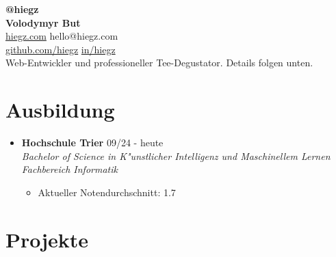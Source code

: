 \documentclass[]{article}
\begin{document}
\begin{center}
    \textbf{\Large @hiegz} \\[3pt]
    \textbf{\huge Volodymyr But} \\[7pt]

     \href{https://www.hiegz.com}{hiegz.com}
    \hspace{5pt}
     hello@hiegz.com \\[2pt]

     \href{https://github.com/hiegz}{github.com/hiegz}
    \hspace{5pt}
     \href{https://linkedin.com/in/hiegz}{in/hiegz} \\[10pt]

    Web-Entwickler und professioneller Tee-Degustator. Details folgen unten.
\end{center}

\section{Ausbildung}

\begin{itemize}[leftmargin=0.15in, rightmargin=0.15in, label={}]
    \item {\large\bfseries Hochschule Trier} \hfill 09/24 - heute \\
        {\itshape Bachelor of Science in K"unstlicher Intelligenz und Maschinellem Lernen \\ Fachbereich Informatik}

        \begin{itemize}
            \item Aktueller Notendurchschnitt: 1.7
        \end{itemize}
\end{itemize}

\section{Projekte}
\end{document}
